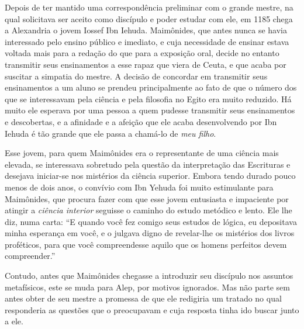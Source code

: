 Depois de ter mantido uma correspondência preliminar com o grande
mestre, na qual solicitava ser aceito como discípulo e poder estudar com
ele, em 1185 chega a Alexandria o jovem Iossef Ibn Iehuda. Maimônides,
que antes nunca se havia interessado pelo ensino público e imediato, e
cuja necessidade de ensinar estava voltada mais para a redação do que
para a exposição oral, decide no entanto transmitir seus ensinamentos a
esse rapaz que viera de Ceuta, e que acaba por suscitar a simpatia do
mestre. A decisão de concordar em transmitir seus ensinamentos a um
aluno se prendeu principalmente ao fato de que o número dos que se
interessavam pela ciência e pela filosofia no Egito era muito reduzido.
Há muito ele esperava por uma pessoa a quem pudesse transmitir seus
ensinamentos e descobertas, e a afinidade e a afeição que ele acaba
desenvolvendo por Ibn Iehuda é tão grande que ele passa a chamá-lo de
\emph{meu filho}.

Esse jovem, para quem Maimônides era o representante de uma ciência mais
elevada, se interessava sobretudo pela questão da interpretação das
Escrituras e desejava iniciar-se nos mistérios da ciência superior.
Embora tendo durado pouco menos de dois anos, o convívio com Ibn Yehuda
foi muito estimulante para Maimônides, que procura fazer com que esse
jovem entusiasta e impaciente por atingir a \emph{ciência interior}
seguisse o caminho do estudo metódico e lento. Ele lhe diz, numa carta:
``E quando você fez comigo seus estudos de lógica, eu depositava minha
esperança em você, e o julgava digno de revelar-lhe os mistérios dos
livros proféticos, para que você compreendesse aquilo que os homens
perfeitos devem compreender.''

Contudo, antes que Maimônides chegasse a introduzir seu discípulo nos
assuntos metafísicos, este se muda para Alep, por motivos ignorados. Mas
não parte sem antes obter de seu mestre a promessa de que ele redigiria
um tratado no qual responderia as questões que o preocupavam e cuja
resposta tinha ido buscar junto a ele.

